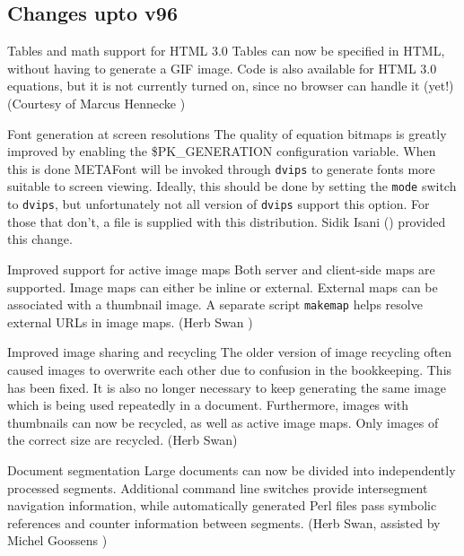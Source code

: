 \subsection{Changes upto v96}
\begin{changebar}
\begin{htmllist}
\item[Tables and math support for HTML 3.0]
Tables can now be specified in HTML, without having to generate a
GIF image.  Code is also available for HTML 3.0 equations, but it is not
currently turned on, since no browser can handle it (yet!)
(Courtesy of Marcus Hennecke )

\item[Font generation at screen resolutions]
The quality of equation bitmaps is greatly improved by enabling the
\$PK\_GENERATION configuration variable.  When this is done
METAFont will be invoked through \texttt{dvips} to generate fonts
more suitable to screen viewing.  Ideally, this should be done
by setting the \texttt{mode} switch to \texttt{dvips}, but unfortunately
not all version of \texttt{dvips} support this option.  For those
that don't, a  file is supplied with this distribution.
Sidik Isani () provided this 
change.

\item[Improved support for active image maps]
Both server and client-side maps are supported.  Image maps can
either be inline or external.  External maps can be associated
with a thumbnail image.  A separate script \texttt{makemap} helps
resolve external URLs in image maps.  (Herb Swan )

\item[Improved image sharing and recycling]
The older version of image recycling often caused images to
overwrite each other due to confusion in the bookkeeping.
This has been fixed.  It is also no longer necessary to keep
generating the same image which is being used repeatedly in a
document.  Furthermore, images with thumbnails can now be
recycled, as well as active image maps.  Only images of the
correct size are recycled.  (Herb Swan)

\item[Document segmentation]
Large documents can now be divided into independently processed
segments.  Additional command line switches provide intersegment
navigation information, while automatically generated Perl
files pass symbolic references and counter information
between segments.  (Herb Swan, assisted by Michel Goossens
)


\end{htmllist}
\end{changebar}
